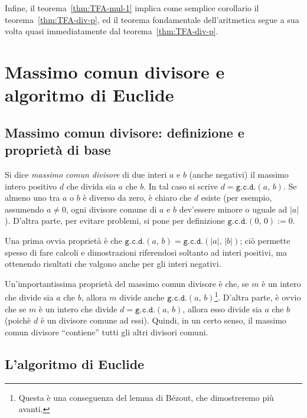 \documentclass[pdflatex,11pt,a4paper,oneside]{article}
\newcommand{\TFA}{teorema fondamentale dell'aritmetica}
\let\OldEmph\emph
\renewcommand{\emph}[1]{\OldEmph{#1\/}}
\newcommand{\abs}[1]{\left|{#1}\right|}
\newcommand{\gcdop}[0]{\ensuremath{\mathtt{g.c.d.}}}
\newcommand{\xgcd}[1]{\ensuremath{\gcdop\left({#1}\right)}}
\renewcommand{\gcd}[2]{\xgcd{{#1},\,{#2}}}
\begin{document}
Infine, il teorema~\eqref{thm:TFA-mul-1} implica come semplice corollario
il teorema~\eqref{thm:TFA-div-p}, ed il \TFA{} segue a sua volta quasi
immediatamente dal teorema~\eqref{thm:TFA-div-p}.


\section{Massimo comun divisore e algoritmo di Euclide}


\subsection{Massimo comun divisore: definizione e propriet\`a di base}

Si dice \emph{massimo comun divisore} di due interi $a$ e $b$ (anche
negativi) il massimo intero positivo $d$ che divida sia $a$ che $b$.
In tal caso si scrive $d = \gcd{a}{b}$.  Se almeno uno tra $a$ o $b$
\`e diverso da zero, \`e chiaro che $d$ esiste (per esempio, assumendo
$a \neq 0$, ogni divisore comune di $a$ e $b$ dev'essere minore o
uguale ad $\abs{a}$).  D'altra parte, per evitare problemi, si pone
per definizione $\gcd{0}{0} := 0$.

Una prima ovvia propriet\`a \`e che $\gcd{a}{b} = \gcd{\abs{a}}{\abs{b}}$;
ci\`o permette spesso di fare calcoli e dimostrazioni riferendosi soltanto
ad interi positivi, ma ottenendo risultati che valgono anche per gli
interi negativi.

Un'importantissima propriet\`a del massimo comun divisore \`e che, se
$m$ \`e un intero che divide sia $a$ che $b$, allora $m$ divide anche
$\gcd{a}{b}$\footnote{Questa \`e una conseguenza del lemma di B\'ezout,
che dimostreremo pi\`u avanti.}. D'altra parte, \`e ovvio che se $m$ \`e
un intero che divide $d = \gcd{a}{b}$, allora esso divide sia $a$ che $b$
(poich\`e $d$ \`e un divisore comune ad essi).  Quindi, in un certo senso,
il massimo comun divisore ``contiene'' tutti gli altri divisori comuni.


\subsection{L'algoritmo di Euclide}
\end{document}
